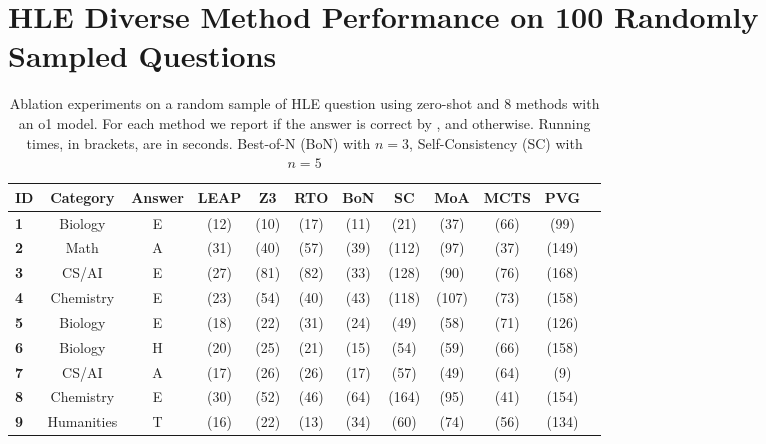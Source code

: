 \section{HLE Diverse Method Performance on 100 Randomly Sampled Questions}
\label{appendix:T}

\begin{table*}[htb]
\label{tab:HLEeval}
\caption{Ablation experiments on a random sample of HLE question using zero-shot and 8 methods with an o1 model. For each method we report if the answer is correct by \C, and \X otherwise. Running times, in brackets, are in seconds. Best-of-N (BoN) with $n = 3$, Self-Consistency (SC) with $n = 5$}
\begin{center}
\begin{tiny}
\begin{tabular}{l|c|c|ccccccccc}
\toprule
{\bf ID} & {\bf Category} & {\bf Answer} &{\bf LEAP} & {\bf Z3} & {\bf RTO} & {\bf BoN} & {\bf SC} & {\bf MoA} & {\bf MCTS} & {\bf PVG} \\     
\midrule
\textbf{1} & Biology & E  &\X [C] (12) & \X [C] (10) & \X [script] (17) & \C [E] (11) & \X [C] (21) & \X [C] (37) & \X [C] (66) & \X [C] (99)\\  
\textbf{2} & Math & A  & \X [B] (31) & \X [B] (40) & \X [B] (57) & \X [B] (39) & \X [B] (112) & \X [B] (97) & \X [error] (37) & \X [B] (149)\\
\textbf{3} & CS/AI & E  & \X [A] (27) & \X [A] (81) & \X [python] (82) & \C [E] (33) & \X [A] (128) & \X [D] (90) & \C [E] (76) & \X [D] (168)\\
\textbf{4} & Chemistry & E  & \X [A] (23) & \X [C] (54) & \X [A] (40) & \X [A] (43) & \X [A] (118) & \X [A] (107) & \X [A] (73) & \X [H] (158)\\
\textbf{5} & Biology & E  & \X [C] (18) & \X [C] (22) & \X [C] (31) & \X [C] (24) & \X [C] (49) & \X [C] (58) & \X [C] (71) & \X [C] (126)\\
\textbf{6} & Biology & H  & \X [C] (20) & \X [C] (25) & \X [C] (21) & \X [C] (15) & \X [C] (54) & \X [C] (59) & \X [C] (66) & \X [C] (158)\\
\textbf{7} & CS/AI & A  & \X [C] (17) & \X [C] (26) & \X [error] (26) & \X [C] (17) & \X [C] (57) & \X [C] (49) & \X [C] (64) & \X [error] (9)\\
\textbf{8} & Chemistry & E  & \X [G] (30) & \X [14/16] (52) & \C [E] (46) & \C [E] (64) & \X [B] (164) & \X [G] (95) & \X [error] (41) & \X [G] (154)\\
\textbf{9} & Humanities & T  & \X [E] (16) & \X [E] (22) & \X [E] (13) & \X [E] (34) & \X [E] (60) & \X [E] (74) & \X [E] (56) & \X [C] (134)\\

\end{tabular}
\end{tiny}
\end{center}
\end{table*}
